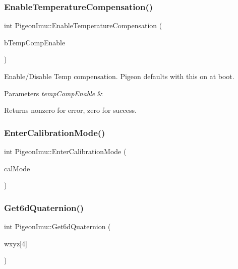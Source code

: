 \subsubsection{\texorpdfstring{Enable\+Temperature\+Compensation()}{EnableTemperatureCompensation()}}
{\footnotesize\ttfamily int Pigeon\+Imu\+::\+Enable\+Temperature\+Compensation (\begin{DoxyParamCaption}\item[{bool}]{b\+Temp\+Comp\+Enable }\end{DoxyParamCaption})}

Enable/\+Disable Temp compensation. Pigeon defaults with this on at boot. 
\begin{DoxyParams}{Parameters}
{\em temp\+Comp\+Enable} & \\
\hline
\end{DoxyParams}
\begin{DoxyReturn}{Returns}
nonzero for error, zero for success. 
\end{DoxyReturn}
\mbox{\label{class_pigeon_imu_a5fbb5eb21a0d6788813a669ba57cf9a3}} 
\subsubsection{\texorpdfstring{Enter\+Calibration\+Mode()}{EnterCalibrationMode()}}
{\footnotesize\ttfamily int Pigeon\+Imu\+::\+Enter\+Calibration\+Mode (\begin{DoxyParamCaption}\item[{\hyperlink{class_pigeon_imu_a1d73ea84ad5c812e809698fab0b9b490}{Calibration\+Mode}}]{cal\+Mode }\end{DoxyParamCaption})}

\mbox{\label{class_pigeon_imu_a11a9f6bd0c9816cc0dae30db8f54e248}} 
\subsubsection{\texorpdfstring{Get6d\+Quaternion()}{Get6dQuaternion()}}
{\footnotesize\ttfamily int Pigeon\+Imu\+::\+Get6d\+Quaternion (\begin{DoxyParamCaption}\item[{double}]{wxyz\mbox{[}4\mbox{]} }\end{DoxyParamCaption})}

